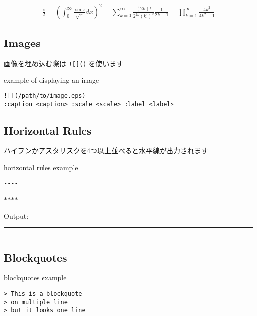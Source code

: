 \documentclass[a4j, titlepage]{jarticle}
\begin{document}
\begin{eqnarray*}
\frac{\pi}{2}
= \left( \int_{0}^{\infty} \frac{\sin x}{\sqrt{x}} dx \right)^2 
= \sum_{k=0}^{\infty} \frac{(2k)!}{2^{2k}(k!)^2} \frac{1}{2k+1} 
= \prod_{k=1}^{\infty} \frac{4k^2}{4k^2 - 1}
\end{eqnarray*}

\subsection{Images}

画像を埋め込む際は {\tt ![]()} を使います

\begin{itembox}[c]{example of displaying an image}
\begin{verbatim}
![](/path/to/image.eps)
:caption <caption> :scale <scale> :label <label>
\end{verbatim}
\end{itembox}

\subsection{Horizontal Rules}

ハイフンかアスタリスクを4つ以上並べると水平線が出力されます

\begin{itembox}[c]{horizontal rules example}
\begin{verbatim}
----

****
\end{verbatim}
\end{itembox}

Output:

\begin{center}
\rule{3in}{0.4pt}
\end{center}

\begin{center}
\rule{3in}{0.4pt}
\end{center}

\subsection{Blockquotes}

\begin{itembox}[c]{blockquotes example}
\begin{verbatim}
> This is a blockquote
> on multiple line
> but it looks one line
\end{verbatim}
\end{itembox}
\end{document}
